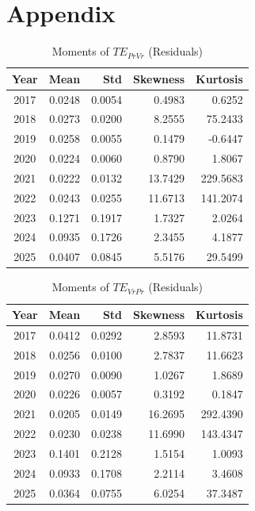 \documentclass{elsarticle}
\def\rightarrow{}%
\begin{document}
\section*{Appendix}

\begin{table}[H]
  \caption{Moments of $TE_{Pr \rightarrow Vr}$ (Residuals)}
  \label{tab:ter_pr2vr_moments_app}
  \centering
  \begin{tabular}{crrrr}
    \hline\noalign{\smallskip}
    \textbf{Year} & \textbf{Mean} & \textbf{Std} & \textbf{Skewness} & \textbf{Kurtosis} \\
    \hline\noalign{\smallskip}
    2017 & 0.0248 & 0.0054 & 0.4983 & 0.6252 \\
    2018 & 0.0273 & 0.0200 & 8.2555 & 75.2433 \\
    2019 & 0.0258 & 0.0055 & 0.1479 & -0.6447 \\
    2020 & 0.0224 & 0.0060 & 0.8790 & 1.8067 \\
    2021 & 0.0222 & 0.0132 & 13.7429 & 229.5683 \\
    2022 & 0.0243 & 0.0255 & 11.6713 & 141.2074 \\
    2023 & 0.1271 & 0.1917 & 1.7327 & 2.0264 \\
    2024 & 0.0935 & 0.1726 & 2.3455 & 4.1877 \\
    2025 & 0.0407 & 0.0845 & 5.5176 & 29.5499 \\
    \hline
  \end{tabular}
\end{table}


\begin{table}[H]
  \caption{Moments of $TE_{Vr \rightarrow Pr}$ (Residuals)}
  \label{tab:ter_vr2pr_moments_app}
  \centering
  \begin{tabular}{crrrr}
    \hline\noalign{\smallskip}
    \textbf{Year} & \textbf{Mean} & \textbf{Std} & \textbf{Skewness} & \textbf{Kurtosis} \\
    \hline\noalign{\smallskip}
    2017 & 0.0412 & 0.0292 & 2.8593 & 11.8731 \\
    2018 & 0.0256 & 0.0100 & 2.7837 & 11.6623 \\
    2019 & 0.0270 & 0.0090 & 1.0267 & 1.8689 \\
    2020 & 0.0226 & 0.0057 & 0.3192 & 0.1847 \\
    2021 & 0.0205 & 0.0149 & 16.2695 & 292.4390 \\
    2022 & 0.0230 & 0.0238 & 11.6990 & 143.4347 \\
    2023 & 0.1401 & 0.2128 & 1.5154 & 1.0093 \\
    2024 & 0.0933 & 0.1708 & 2.2114 & 3.4608 \\
    2025 & 0.0364 & 0.0755 & 6.0254 & 37.3487 \\
    \hline
  \end{tabular}
\end{table}
\end{document}
